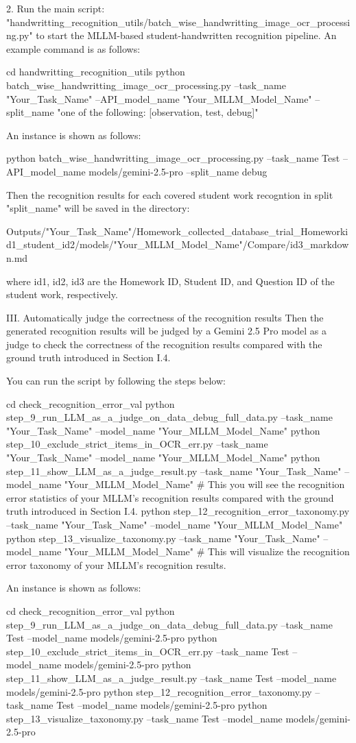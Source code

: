 2. Run the main script: "handwritting_recognition_utils/batch_wise_handwritting_image_ocr_processing.py" to start the MLLM-based student-handwritten recognition pipeline. An example command is as follows:

cd handwritting_recognition_utils
python batch_wise_handwritting_image_ocr_processing.py --task_name "Your_Task_Name" --API_model_name "Your_MLLM_Model_Name" --split_name "one of the following: [observation, test, debug]"

An instance is shown as follows:

python batch_wise_handwritting_image_ocr_processing.py --task_name Test --API_model_name models/gemini-2.5-pro --split_name debug

Then the recognition results for each covered student work recogntion in split "split_name" will be saved in the directory:

Outputs/{"Your_Task_Name"}/Homework_collected_database_trial_Homework{id1}_student_{id2}/models/"Your_MLLM_Model_Name"/Compare/{id3}_markdown.md

where {id1}, {id2}, {id3} are the Homework ID, Student ID, and Question ID of the student work, respectively.


III. Automatically judge the correctness of the recognition results
Then the generated recognition results will be judged by a Gemini 2.5 Pro model as a judge to check the correctness of the recognition results compared with the ground truth introduced in Section I.4.

You can run the script by following the steps below:

cd check_recognition_error_val
python step_9_run_LLM_as_a_judge_on_data_debug_full_data.py --task_name "Your_Task_Name" --model_name "Your_MLLM_Model_Name"
python step_10_exclude_strict_items_in_OCR_err.py --task_name "Your_Task_Name" --model_name "Your_MLLM_Model_Name"
python step_11_show_LLM_as_a_judge_result.py --task_name "Your_Task_Name" --model_name "Your_MLLM_Model_Name" # This you will see the recognition error statistics of your MLLM's recognition results compared with the ground truth introduced in Section I.4.
python step_12_recognition_error_taxonomy.py --task_name "Your_Task_Name" --model_name "Your_MLLM_Model_Name"
python step_13_visualize_taxonomy.py --task_name "Your_Task_Name" --model_name "Your_MLLM_Model_Name" # This will visualize the recognition error taxonomy of your MLLM's recognition results.

An instance is shown as follows:

cd check_recognition_error_val
python step_9_run_LLM_as_a_judge_on_data_debug_full_data.py --task_name Test --model_name models/gemini-2.5-pro
python step_10_exclude_strict_items_in_OCR_err.py --task_name Test --model_name models/gemini-2.5-pro
python step_11_show_LLM_as_a_judge_result.py --task_name Test --model_name models/gemini-2.5-pro
python step_12_recognition_error_taxonomy.py --task_name Test --model_name models/gemini-2.5-pro
python step_13_visualize_taxonomy.py --task_name Test --model_name models/gemini-2.5-pro